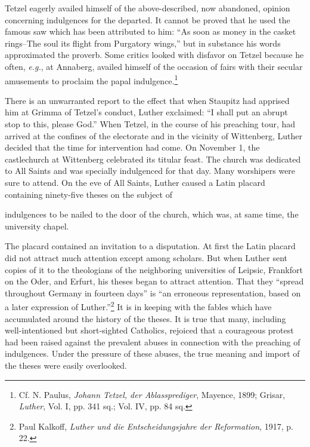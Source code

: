 Tetzel eagerly availed himself of the above-described, now abandoned,
opinion concerning indulgences for the departed. It cannot
be proved that he used the famous saw which has been attributed
to him: “As soon as money in the casket rings--The soul its flight
from Purgatory wings,” but in substance his words approximated
the proverb. Some critics looked with disfavor on Tetzel because
he often, \textit{e.g.}, at Annaberg, availed himself of the occasion of fairs
with their secular amusements to proclaim the papal indulgence.\footnote
{Cf. N. Paulus, \textit{Johann Tetzel, der Ablassprediger}, Mayence, 1899; Grisar, \textit{Luther}, Vol.
I, pp. 341 sq.; Vol. IV, pp. 84 sq.}

There is an unwarranted report to the effect that when Staupitz
had apprised him at Grimma of Tetzel’s conduct, Luther exclaimed:
“I shall put an abrupt stop to this, please God.” When Tetzel, in
the course of his preaching tour, had arrived at the confines of the
electorate and in the vicinity of Wittenberg, Luther decided that
the time for intervention had come. On November 1, the castlechurch
at Wittenberg celebrated its titular feast. The church was
dedicated to All Saints and was specially indulgenced for that day.
Many worshipers were sure to attend. On the eve of All Saints, Luther
caused a Latin placard containing ninety-five theses on the subject of


indulgences to be nailed to the door of the church, which was, at
same time, the university chapel.

The placard contained an invitation to a disputation. At first the
Latin placard did not attract much attention except among scholars.
But when Luther sent copies of it to the theologians of the neighboring
universities of Leipsic, Frankfort on the Oder, and Erfurt,
his theses began to attract attention. That they “spread throughout
Germany in fourteen days” is “an erroneous representation, based
on a later expression of Luther.”\footnote
{Paul Kalkoff, \textit{Luther und die Entscheidungsjahre der Reformation}, 1917, p. 22.}
It is in keeping with the fables
which have accumulated around the history of the theses. It is true
that many, including well-intentioned but short-sighted Catholics,
rejoiced that a courageous protest had been raised against the prevalent
abuses in connection with the preaching of indulgences. Under
the pressure of these abuses, the true meaning and import of the
theses were easily overlooked.

